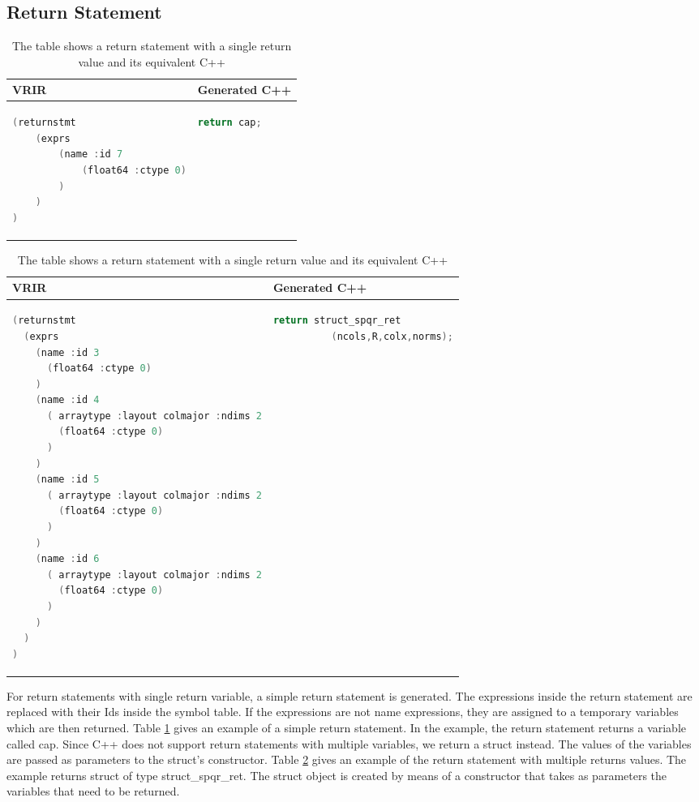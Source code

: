 \subsection{Return Statement}
\begin{table}[htbp]
\centering
\begin{tabular}{|l|l|}
\hline

VRIR &  Generated C++ \\
\hline
{
\begin{lstlisting}[language=c,frame=none, numbers=none]
(returnstmt
	(exprs
		(name :id 7
			(float64 :ctype 0)
		)
	)
)
\end{lstlisting}
}
&
{
\begin{lstlisting}[language=c,frame=none, numbers=none]
return cap;
\end{lstlisting}
} \\
\hline
\end{tabular}
\caption[Simple return statement]{The table shows a return statement with a single return value and its equivalent C++}
\label{tab:simpleReturn}
\end{table}
\begin{table}[htbp]
\centering
\begin{tabular}{|l|l|}
\hline

VRIR &  Generated C++ \\
\hline
{
\begin{lstlisting}[language=c,frame=none, numbers=none]
(returnstmt
  (exprs
    (name :id 3
      (float64 :ctype 0)
    )
    (name :id 4
      ( arraytype :layout colmajor :ndims 2
        (float64 :ctype 0)
      )
    )
    (name :id 5
      ( arraytype :layout colmajor :ndims 2
        (float64 :ctype 0)
      )
    )
    (name :id 6
      ( arraytype :layout colmajor :ndims 2
        (float64 :ctype 0)
      )
    )
  )
)
\end{lstlisting}
}
&
{
\begin{lstlisting}[language=c,frame=none, numbers=none]
return struct_spqr_ret
          (ncols,R,colx,norms);
\end{lstlisting}
} \\
\hline
\end{tabular}
\caption[Simple return statement]{The table shows a return statement with a single return value and its equivalent C++}
\label{tab:multiReturn}
\end{table}
For return statements with single return variable, a simple return statement is generated. The expressions inside the return statement are replaced with their Ids inside the symbol table. If the expressions are not name expressions, they are assigned to a temporary variables which are then returned. Table \ref{tab:simpleReturn} gives an example of a simple return statement. In the example, the return statement returns a variable called cap. 
Since C++ does not support return statements with multiple variables, we return a struct instead. The values of the variables are passed as parameters to the struct's constructor. Table \ref{tab:multiReturn} gives an example of the return statement with multiple returns values. The example returns struct of type struct\_spqr\_ret. The struct object is created by means of a constructor that takes as parameters the variables that need to be returned. 
